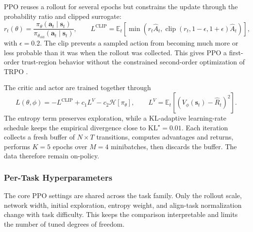 PPO reuses a rollout for several epochs but constrains the update through the probability ratio and clipped surrogate:
\begin{equation}
r_t(\theta)=\frac{\pi_\theta(\bm a_t\mid\bm s_t)}{\pi_{\theta_{\mathrm{old}}}(\bm a_t\mid\bm s_t)},\qquad
L^{\mathrm{CLIP}}=\mathbb{E}_t\!\left[\min\!\left(r_t\hat A_t,\operatorname{clip}(r_t,1-\epsilon,1+\epsilon)\hat A_t\right)\right],
\label{rl:eq:rl-clip}
\end{equation}
with $\epsilon=0.2$. The clip prevents a sampled action from becoming much more or less probable than it was when the rollout was collected. This gives PPO a first-order trust-region behavior without the constrained second-order optimization of TRPO \cite{schulman_2015_trpo,schulman_2017_ppo}.

The critic and actor are trained together through
\begin{equation}
L(\theta,\phi)=-L^{\mathrm{CLIP}}+c_1L^V-c_2\mathcal{H}[\pi_\theta],
\qquad L^V=\mathbb{E}_t\!\left[(V_\phi(\bm s_t)-\hat R_t)^2\right].
\label{rl:eq:rl-total}
\end{equation}
The entropy term preserves exploration, while a KL-adaptive learning-rate schedule keeps the empirical divergence close to $\mathrm{KL}^{\star}=0.01$. Each iteration collects a fresh buffer of $N\times T$ transitions, computes advantages and returns, performs $K=5$ epochs over $M=4$ minibatches, then discards the buffer. The data therefore remain on-policy.

\subsubsection{Per-Task Hyperparameters}

The core PPO settings are shared across the task family. Only the rollout scale, network width, initial exploration, entropy weight, and align-task normalization change with task difficulty. This keeps the comparison interpretable and limits the number of tuned degrees of freedom.

